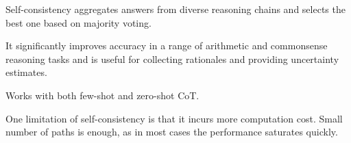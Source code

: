Self-consistency aggregates answers from diverse reasoning chains and selects the best one based on majority voting. \cite{wang2023selfconsistencyimproveschainthought}

It significantly improves accuracy in a range of arithmetic and commonsense reasoning tasks and is useful for collecting rationales and providing uncertainty estimates. \cite{wang2023selfconsistencyimproveschainthought}

Works with both few-shot and zero-shot CoT. \cite{wang2023selfconsistencyimproveschainthought}

One limitation of self-consistency is that it incurs more computation cost. Small number of paths is enough, as in most cases the performance saturates quickly. \cite{wang2023selfconsistencyimproveschainthought}
